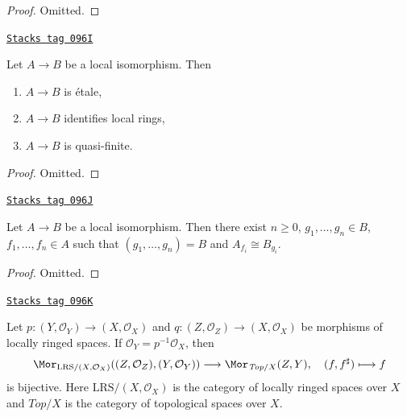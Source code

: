 \begin{proof}
Omitted.
\end{proof}

\begin{lemma}
\label{proetale-lemma-local-isomorphism-implies}
\href{https://stacks.math.columbia.edu/tag/096I}{\texttt{Stacks tag 096I}}

Let $A \to B$ be a local isomorphism. Then
\begin{enumerate}
\item $A \to B$ is \'etale,
\item $A \to B$ identifies local rings,
\item $A \to B$ is quasi-finite.
\end{enumerate}
\end{lemma}

\begin{proof}
Omitted.
\end{proof}

\begin{lemma}
\label{proetale-lemma-structure-local-isomorphism}
\href{https://stacks.math.columbia.edu/tag/096J}{\texttt{Stacks tag 096J}}

Let $A \to B$ be a local isomorphism. Then there exist $n \geq 0$,
$g_1, \ldots, g_n \in B$, $f_1, \ldots, f_n \in A$ such that
$(g_1, \ldots, g_n) = B$ and $A_{f_i} \cong B_{g_i}$.
\end{lemma}

\begin{proof}
Omitted.
\end{proof}

\begin{lemma}
\label{proetale-lemma-fully-faithful-spaces-over-X}
\href{https://stacks.math.columbia.edu/tag/096K}{\texttt{Stacks tag 096K}}

Let $p : (Y, \mathcal{O}_Y) \to (X, \mathcal{O}_X)$ and
$q : (Z, \mathcal{O}_Z) \to (X, \mathcal{O}_X)$
be morphisms of locally ringed spaces.
If $\mathcal{O}_Y = p^{-1}\mathcal{O}_X$, then
$$
\Mor_{\text{LRS}/(X, \mathcal{O}_X)}((Z, \mathcal{O}_Z), (Y, \mathcal{O}_Y))
\longrightarrow
\Mor_{\textit{Top}/X}(Z, Y),\quad
(f, f^\sharp) \longmapsto f
$$
is bijective. Here $\text{LRS}/(X, \mathcal{O}_X)$ is the category of
locally ringed spaces over $X$ and $\textit{Top}/X$ is the category
of topological spaces over $X$.
\end{lemma}

